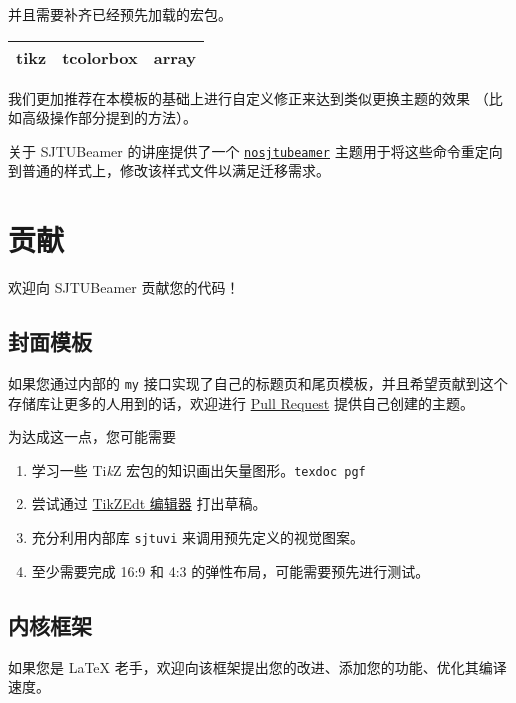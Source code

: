 \documentclass[
    UTF8,
    heading=true,
    12pt,
    a4paper
]{ctexrep}
\newcommand{\cls}[1]{\texttt{#1}}
\newcommand{\opt}[1]{\texttt{#1}}
\def\themename{\textsf{SJTUBeamer}}
\begin{document}
并且需要补齐已经预先加载的宏包。

\begin{table}[h]
  \centering

  \begin{tabular}
    {>{\sffamily}c>{\sffamily}c>{\sffamily}c}
    \hline
    tikz & tcolorbox & array \\
    \hline
  \end{tabular}
\end{table}

我们更加推荐在本模板的基础上进行自定义修正来达到类似更换主题的效果
（比如高级操作部分提到的方法）。

关于 \themename{} 的讲座提供了一个
\href{https://github.com/sjtug/sjtulib-latex-talk/blob/logcreative-2022/beamerthemenosjtubeamer.sty}
{\cls{nosjtubeamer}}
主题用于将这些命令重定向到普通的样式上，修改该样式文件以满足迁移需求。

\chapter{贡献}

欢迎向 \themename{} 贡献您的代码！

\section{封面模板}

如果您通过内部的 \opt{my}
接口实现了自己的标题页和尾页模板，并且希望贡献到这个存储库让更多的人用到的话，欢迎进行
\href{https://github.com/sjtug/SJTUBeamer/pulls}{Pull Request}
提供自己创建的主题。

为达成这一点，您可能需要
\begin{enumerate}
  \item 学习一些 Ti\textit{k}Z
        宏包的知识画出矢量图形。\texttt{texdoc pgf}
  \item 尝试通过
        \href{https://code.google.com/archive/p/tikzedt/downloads}{TikZEdt 编辑器} 打出草稿。
  \item 充分利用内部库 \texttt{sjtuvi} 来调用预先定义的视觉图案。
  \item 至少需要完成 16:9 和 4:3 的弹性布局，可能需要预先进行测试。
\end{enumerate}

\section{内核框架}

如果您是 \LaTeX{} 老手，欢迎向该框架提出您的改进、添加您的功能、优化其编译速度。
\end{document}

